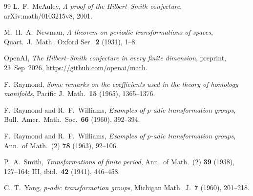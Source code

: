 \documentclass[11pt]{article}
\theoremstyle{definition}
\begin{document}
\begin{thebibliography}{99}
L.~F.\ McAuley,
\textit{A proof of the Hilbert--Smith conjecture},
arXiv:math/0103215v8, 2001.

M.~H.~A.\ Newman,
\textit{A theorem on periodic transformations of spaces},
Quart.\ J.\ Math.\ Oxford Ser.\ \textbf{2} (1931), 1--8.

OpenAI,
\textit{The Hilbert--Smith conjecture in every finite dimension},
preprint, 23~Sep~2026,
\url{https://github.com/openai/math}.

F.~Raymond,
\textit{Some remarks on the coefficients used in the theory of homology manifolds},
Pacific J.\ Math.\ \textbf{15} (1965), 1365--1376.

F.~Raymond and R.~F.\ Williams,
\textit{Examples of $p$-adic transformation groups},
Bull.\ Amer.\ Math.\ Soc.\ \textbf{66} (1960), 392--394.

F.~Raymond and R.~F.\ Williams,
\textit{Examples of $p$-adic transformation groups},
Ann.\ of Math.\ (2) \textbf{78} (1963), 92--106.

P.~A.\ Smith,
\textit{Transformations of finite period},
Ann.\ of Math.\ (2) \textbf{39} (1938), 127--164; III,
ibid.\ \textbf{42} (1941), 446--458.

C.~T.\ Yang,
\textit{$p$-adic transformation groups},
Michigan Math.\ J.\ \textbf{7} (1960), 201--218.

\end{thebibliography}
\end{document}
